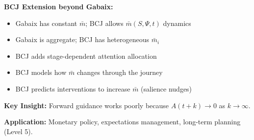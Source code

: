 \begin{tcolorbox}[colback=green!5!white, colframe=green!75!black,
    title=Theorem BCJ-T23: Gabaix Behavioral Macro as Special Case]
\textbf{BCJ Extension beyond Gabaix:}
\begin{itemize}[nosep]
\item Gabaix has constant $\bar{m}$; BCJ allows $\bar{m}(S, \Psi, t)$ dynamics
\item Gabaix is aggregate; BCJ has heterogeneous $\bar{m}_i$
\item BCJ adds stage-dependent attention allocation
\item BCJ models how $\bar{m}$ changes through the journey
\item BCJ predicts interventions to increase $\bar{m}$ (salience nudges)
\end{itemize}

\textbf{Key Insight:} Forward guidance works poorly because $A(t+k) \to 0$ as $k \to \infty$.

\textbf{Application:} Monetary policy, expectations management, long-term planning (Level 5).
\end{tcolorbox}

